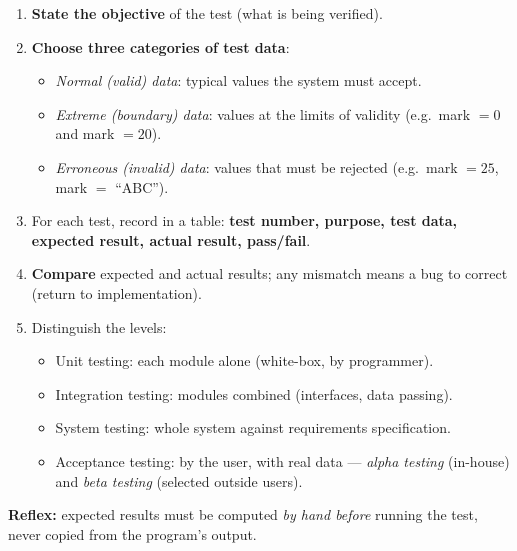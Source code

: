 \documentclass[11pt]{article}
\newcommand{\cle}[1]{{\popxbold\color{popdark}#1}}
\begin{document}
\begin{methode}
\begin{enumerate}
\item \textbf{State the objective} of the test (what is being verified).
\item \textbf{Choose three categories of test data}:
\begin{itemize}
\item \emph{Normal (valid) data}: typical values the system must accept.
\item \emph{Extreme (boundary) data}: values at the limits of validity (e.g.\ mark $=0$ and mark $=20$).
\item \emph{Erroneous (invalid) data}: values that must be rejected (e.g.\ mark $=25$, mark $=$ ``ABC'').
\end{itemize}
\item For each test, record in a table: \textbf{test number, purpose, test data, expected result, actual result, pass/fail}.
\item \textbf{Compare} expected and actual results; any mismatch means a bug to correct (return to implementation).
\item Distinguish the levels:
\begin{itemize}
\item \cle{Unit testing}: each module alone (white-box, by programmer).
\item \cle{Integration testing}: modules combined (interfaces, data passing).
\item \cle{System testing}: whole system against requirements specification.
\item \cle{Acceptance testing}: by the user, with real data — \emph{alpha testing} (in-house) and \emph{beta testing} (selected outside users).
\end{itemize}
\end{enumerate}
\textbf{Reflex:} expected results must be computed \emph{by hand before} running the test, never copied from the program's output.
\end{methode}
\end{document}
